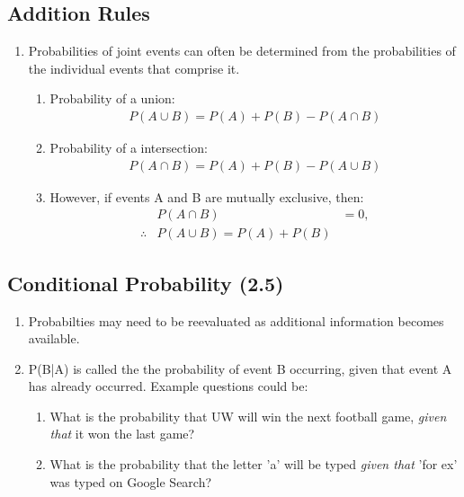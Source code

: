\documentclass[../IND E 315.tex]{subfiles}
\begin{document}
\subsection*{Addition Rules}
\begin{enumerate}
    \item Probabilities of joint events can often be determined from the probabilities of the individual events that comprise it.
        \begin{enumerate}
            \item Probability of a union:
                \begin{equation*}
                    \begin{aligned}
                        P(A \cup B) = P(A) + P(B) - P(A \cap B) 
                    \end{aligned}
                \end{equation*}
            \item Probability of a intersection:
                \begin{equation*}
                    \begin{aligned}
                        P(A \cap B) = P(A) + P(B) - P(A \cup B) 
                    \end{aligned}
                \end{equation*}
            \item However, if events A and B are mutually exclusive, then:
                \begin{equation*}
                    \begin{aligned}
                        & P(A \cap B) &= 0, \\
                        \therefore & P(A \cup B) = P(A) + P(B)
                    \end{aligned}
                \end{equation*}
        \end{enumerate}
\end{enumerate}


\subsection*{Conditional Probability (2.5)}
\begin{enumerate}
    \item Probabilties may need to be reevaluated as additional information becomes available.
    \item P(B|A) is called the the probability of event B occurring, given that event A has already occurred. Example questions could be:
        \begin{enumerate}
            \item What is the probability that UW will win the next football game, \emph{given that} it won the last game?
            \item What is the probability that the letter 'a' will be typed \emph{given that} 'for ex' was typed on Google Search?
        \end{enumerate}
\end{enumerate}
\end{document}

